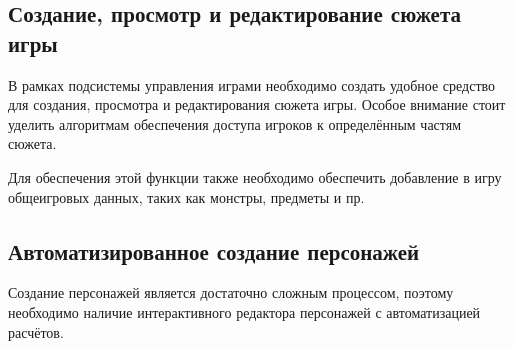 \subsection{Создание, просмотр и редактирование сюжета игры}

В рамках подсистемы управления играми необходимо создать удобное средство для создания, просмотра и редактирования сюжета игры. Особое внимание стоит уделить алгоритмам обеспечения доступа игроков к определённым частям сюжета.

Для обеспечения этой функции также необходимо обеспечить добавление в игру общеигровых данных, таких как монстры, предметы и пр.


\subsection{Автоматизированное создание персонажей}

Создание персонажей является достаточно сложным процессом, поэтому необходимо наличие интерактивного редактора персонажей с автоматизацией расчётов.
